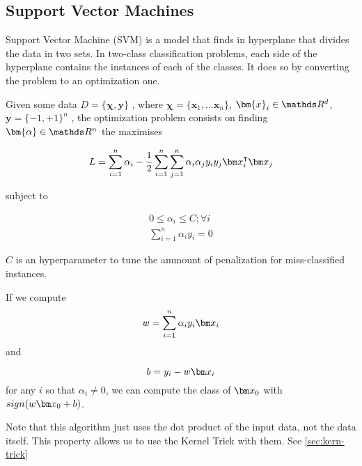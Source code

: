   \subsection{Support Vector Machines}

  \begin{pre-delivery}
    Support Vector Machine (SVM) is a model that finds in hyperplane that
    divides the data in two sets. In two-class classification problems, each
    side of the hyperplane contains the instances of each of the classes.
    It does so by converting the problem to an optimization one.

    Given some data
    $D = \{\bm{\chi}, \bm{y}\}$
    , where
    $\bm{\chi} = \{\bm{x}_1, \ldots \bm{x}_n\}$, $\bm{x}_i \in \reals^d$, $\bm{y} = \{-1, +1\}^n$
    , the optimization problem consists on finding $\bm{\alpha} \in \reals^n$
    the maximises

\begin{equation}
  L = \sum_{i = 1}^n\alpha_i -\frac{1}{2}\sum_{i = 1}^n\sum_{j = 1}^n\alpha_i\alpha_jy_iy_j\vx_i^\transp\vx_j
\end{equation}

subject to

\begin{align}
  0 \leq \alpha_i \leq C; \forall i\\
  \sum_{i = 1}^n \alpha_iy_i = 0
\end{align}

$C$ is an hyperparameter to tune the ammount of penalization for miss-classified
instances.

If we compute
\begin{equation}
  w = \sum_{i = 1}^n\alpha_iy_i\vx_i
\end{equation}
and

\begin{equation}
  b = y_i - w\vx_i
\end{equation}
for any $i$ so that $\alpha_i \neq 0$, we can compute the class of $\vx_0$ with
$sign(w\vx_0 + b)$.

Note that this algorithm just uses the dot product of the input data, not the
data itself. This property allows us to use the Kernel Trick with them.
See \ref{sec:kern-trick}

\end{pre-delivery}


